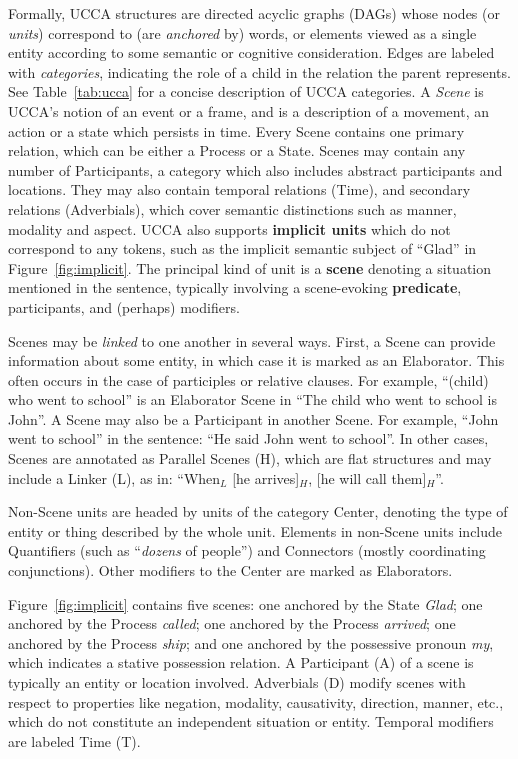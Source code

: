 \documentclass[12pt,a4paper,table]{report}
\begin{document}
   Formally, UCCA structures are directed acyclic graphs (DAGs) whose nodes (or {\it units}) correspond to (are \textit{anchored} by) words,
   or elements viewed as a single entity according to some semantic or cognitive consideration.
   Edges are labeled with \textit{categories}, indicating the role of a child in the relation the parent represents.
   See Table~\ref{tab:ucca} for a concise description of UCCA categories.
   A {\it Scene} is UCCA's notion of an event or a frame, and is a description of a movement, an action or a state which persists in time. 
   Every Scene contains one primary relation, which can be either a Process or a State. 
   Scenes may contain any number of Participants, a category which also includes abstract participants and locations.
   They may also contain temporal relations (Time), and secondary relations (Adverbials), 
   which cover semantic distinctions such as manner, modality and aspect.
   UCCA also supports \textbf{implicit units} which do not correspond to any tokens,
such as the implicit semantic subject of ``Glad'' in Figure~\ref{fig:implicit}.
The principal kind of unit is a \textbf{scene} denoting a situation mentioned in the sentence, typically involving a scene-evoking \textbf{predicate}, participants, and (perhaps) modifiers. 

   Scenes may be \textit{linked} to one another in several ways.
   First, a Scene can provide information about some entity,
   in which case it is marked as an Elaborator.
   This often occurs in the case of participles or relative clauses.
   For example, ``(child) who went to school'' is an Elaborator Scene
   in ``The child who went to school is John''.
   A Scene may also be a Participant in another Scene. For example, ``John went to school'' in the sentence: ``He said John went to school''. 
   In other cases, Scenes are annotated as Parallel Scenes (H), which are flat structures and may include a Linker (L), 
   as in: ``When$_L$ [he arrives]$_H$, [he will call them]$_H$''.

   Non-Scene units are headed by units of the category Center,
   denoting the type of entity or thing described by the whole unit.
   Elements in non-Scene units include Quantifiers (such as ``{\it dozens} of people'') and
   Connectors (mostly coordinating conjunctions).
   Other modifiers to the Center are marked as Elaborators.

Figure~\ref{fig:implicit} contains five scenes: one anchored by the State \textit{Glad}; one anchored by the Process \textit{called}; one anchored by the Process \textit{arrived}; one anchored by the Process \textit{ship}; and one anchored by the possessive pronoun \textit{my}, which indicates a stative possession relation.
A Participant (A) of a scene is typically an entity or location involved. 
Adverbials (D) modify scenes with respect to properties like negation, modality, causativity, direction, manner, etc., which do not constitute an independent situation or entity.
Temporal modifiers are labeled Time (T).
\end{document}
